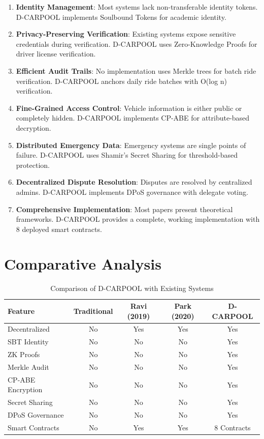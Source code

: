 \begin{enumerate}
    \item \textbf{Identity Management}: Most systems lack non-transferable identity tokens. D-CARPOOL implements Soulbound Tokens for academic identity.
    
    \item \textbf{Privacy-Preserving Verification}: Existing systems expose sensitive credentials during verification. D-CARPOOL uses Zero-Knowledge Proofs for driver license verification.
    
    \item \textbf{Efficient Audit Trails}: No implementation uses Merkle trees for batch ride verification. D-CARPOOL anchors daily ride batches with O(log n) verification.
    
    \item \textbf{Fine-Grained Access Control}: Vehicle information is either public or completely hidden. D-CARPOOL implements CP-ABE for attribute-based decryption.
    
    \item \textbf{Distributed Emergency Data}: Emergency systems are single points of failure. D-CARPOOL uses Shamir's Secret Sharing for threshold-based protection.
    
    \item \textbf{Decentralized Dispute Resolution}: Disputes are resolved by centralized admins. D-CARPOOL implements DPoS governance with delegate voting.
    
    \item \textbf{Comprehensive Implementation}: Most papers present theoretical frameworks. D-CARPOOL provides a complete, working implementation with 8 deployed smart contracts.
\end{enumerate}

\section{Comparative Analysis}

\begin{table}[H]
\centering
\caption{Comparison of D-CARPOOL with Existing Systems}
\begin{tabular}{|l|c|c|c|c|}
\hline
\textbf{Feature} & \textbf{Traditional} & \textbf{Ravi (2019)} & \textbf{Park (2020)} & \textbf{D-CARPOOL} \\
\hline
Decentralized & No & Yes & Yes & Yes \\
SBT Identity & No & No & No & Yes \\
ZK Proofs & No & No & No & Yes \\
Merkle Audit & No & No & No & Yes \\
CP-ABE Encryption & No & No & No & Yes \\
Secret Sharing & No & No & No & Yes \\
DPoS Governance & No & No & No & Yes \\
Smart Contracts & No & Yes & Yes & 8 Contracts \\
\hline
\end{tabular}
\end{table}
